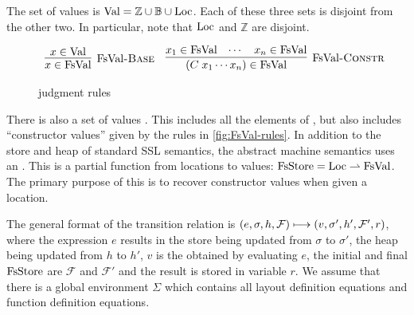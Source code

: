 
The set of values is $\textnormal{Val} = \mathbb{Z} \cup \mathbb{B} \cup \textnormal{Loc}$. Each of these three sets
is disjoint from the other two. In particular, note that $\textnormal{Loc}$ and $\mathbb{Z}$ are disjoint.

\begin{figure}
\[
\begin{array}{c}
  \labinfer[\FsVal-Base]{x \in \FsVal}
    {x \in \Val}
  ~~~
  \labinfer[\FsVal-Constr]{(C\; x_1 \cdots x_n) \in \FsVal}
    {x_1 \in \FsVal & \cdots & x_n \in \FsVal}
\end{array}
\]
  \caption{\FsVal{} judgment rules}
  \label{fig:FsVal-rules}
\end{figure}

There is also a set of \tool values \FsVal. This includes all the elements of \Val{}, but also includes
``constructor values'' given by the rules in \autoref{fig:FsVal-rules}.
In addition to the store and heap of standard SSL semantics, the abstract machine semantics uses an \FsStore. This is a partial function from locations
to \tool values: $\textnormal{FsStore} = \textnormal{Loc} \rightharpoonup \textnormal{FsVal}$. The primary purpose of this is to recover constructor values when given a location.

The general format of the transition relation is $(e, \sigma, h, \mathcal{F}) \longmapsto (v, \sigma', h', \mathcal{F}', r)$, where the expression $e$ results
in the store being updated from $\sigma$ to $\sigma'$, the heap being updated from $h$ to $h'$, $v$ is the \Val{} obtained by
evaluating $e$, the initial and final $\textnormal{FsStore}$ are $\mathcal{F}$ and $\mathcal{F}'$ and the result is stored in variable $r$. We assume that there is a global environment $\Sigma$ which contains all layout definition equations and function definition equations.
%
%

